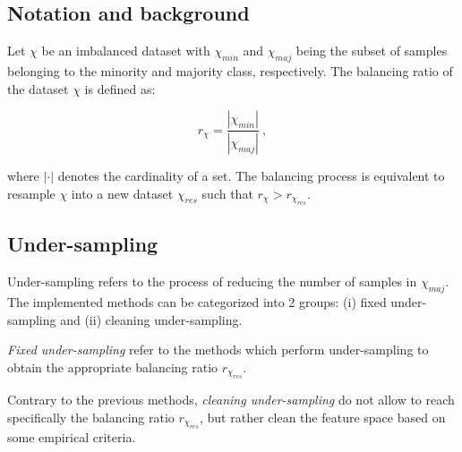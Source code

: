 \documentclass[twoside,11pt]{article}
\begin{document}
\subsection{Notation and background}

Let $\chi$ be an imbalanced dataset with $\chi_{min}$ and $\chi_{maj}$ being the subset of samples belonging to the minority and majority class, respectively.
The balancing ratio of the dataset $\chi$ is defined as:

\begin{equation}
r_{\chi} = \frac{|\chi_{min}|}{|\chi_{maj}|} \ ,
\end{equation}

\noindent where $|\cdot|$ denotes the cardinality of a set. The balancing process is equivalent to resample $\chi$ into a new dataset $\chi_{res}$ such that $r_{\chi} > r_{\chi_{res}}$.

\subsection{Under-sampling}

Under-sampling refers to the process of reducing the number of samples in $\chi_{maj}$.
The implemented methods can be categorized into 2 groups: (i) fixed under-sampling and (ii) cleaning under-sampling.

\emph{Fixed under-sampling} refer to the methods which perform under-sampling to obtain the appropriate balancing ratio $r_{\chi_{res}}$.

Contrary to the previous methods, \emph{cleaning under-sampling} do not allow to reach specifically the balancing ratio $r_{\chi_{res}}$, but rather clean the feature space based on some empirical criteria.

\end{document}
